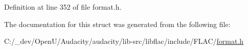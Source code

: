 Definition at line 352 of file format.\+h.



The documentation for this struct was generated from the following file\+:\begin{DoxyCompactItemize}
\item 
C\+:/\+\_\+dev/\+Open\+U/\+Audacity/audacity/lib-\/src/libflac/include/\+F\+L\+A\+C/\hyperlink{include_2_f_l_a_c_2format_8h}{format.\+h}\end{DoxyCompactItemize}
